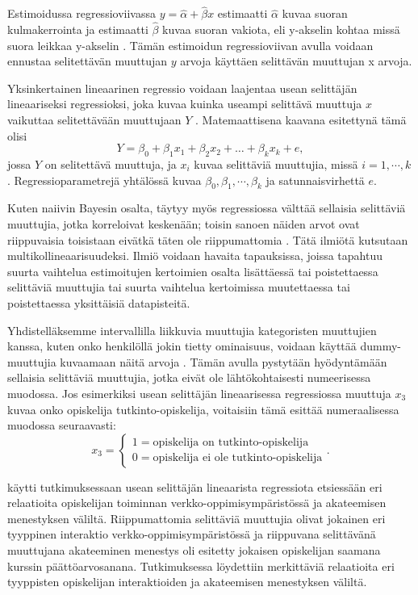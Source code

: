 Estimoidussa regressioviivassa $y = \hat{\alpha} + \hat{\beta}x$ estimaatti $\hat{\alpha}$ kuvaa suoran kulmakerrointa ja estimaatti $\hat{\beta}$ kuvaa suoran vakiota, eli y-akselin kohtaa missä suora leikkaa y-akselin \citep{rossIntroductoryStatistics2017}. Tämän estimoidun regressioviivan avulla voidaan ennustaa selitettävän muuttujan $y$ arvoja käyttäen selittävän muuttujan x arvoja.

Yksinkertainen lineaarinen regressio voidaan laajentaa usean selittäjän lineaariseksi regressioksi, joka kuvaa kuinka useampi selittävä muuttuja $x$ vaikuttaa selitettävään muuttujaan $Y$ \citep{rossIntroductoryStatistics2017}. Matemaattisena kaavana esitettynä tämä olisi $$Y = \beta_0 + \beta_1x_1 + \beta_2x_2 + \ldots + \beta_kx_k + e,$$ jossa $Y$ on selitettävä muuttuja, ja $x_i$ kuvaa selittäviä muuttujia, missä $i = 1, \cdots, k$. Regressioparametrejä yhtälössä kuvaa $\beta_0, \beta_1, \cdots, \beta_k$ ja satunnaisvirhettä $e$.

Kuten naiivin Bayesin osalta, täytyy myös regressiossa välttää sellaisia selittäviä muuttujia, jotka korreloivat keskenään; toisin sanoen näiden arvot ovat riippuvaisia toisistaan eivätkä täten ole riippumattomia \citep{daoudMulticollinearityRegressionAnalysis2017}. Tätä ilmiötä kutsutaan multikollineaarisuudeksi. Ilmiö voidaan havaita tapauksissa, joissa tapahtuu suurta vaihtelua estimoitujen kertoimien osalta lisättäessä tai poistettaessa selittäviä muuttujia tai suurta vaihtelua kertoimissa muutettaessa tai poistettaessa yksittäisiä datapisteitä.

Yhdistelläksemme intervallilla liikkuvia muuttujia kategoristen muuttujien kanssa, kuten onko henkilöllä jokin tietty ominaisuus, voidaan käyttää dummy-muuttujia kuvaamaan näitä arvoja \citep{rossIntroductoryStatistics2017}. Tämän avulla pystytään hyödyntämään sellaisia selittäviä muuttujia, jotka eivät ole lähtökohtaisesti numeerisessa muodossa. Jos esimerkiksi usean selittäjän lineaarisessa regressiossa muuttuja $x_3$ kuvaa onko opiskelija tutkinto-opiskelija, voitaisiin tämä esittää numeraalisessa muodossa seuraavasti: $$x_3 = \begin{cases}1 = \text{opiskelija on tutkinto-opiskelija} \\ 0 = \text{opiskelija ei ole tutkinto-opiskelija}\end{cases}.$$

\citet{agudo-peregrinaCanWePredict2014} käytti tutkimuksessaan usean selittäjän lineaarista regressiota etsiessään eri relaatioita opiskelijan toiminnan verkko-oppimisympäristössä ja akateemisen menestyksen väliltä. Riippumattomia selittäviä muuttujia olivat jokainen eri tyyppinen interaktio verkko-oppimisympäristössä ja riippuvana selittävänä muuttujana akateeminen menestys oli esitetty jokaisen opiskelijan saamana kurssin päättöarvosanana. Tutkimuksessa löydettiin merkittäviä relaatioita eri tyyppisten opiskelijan interaktioiden ja akateemisen menestyksen väliltä.

